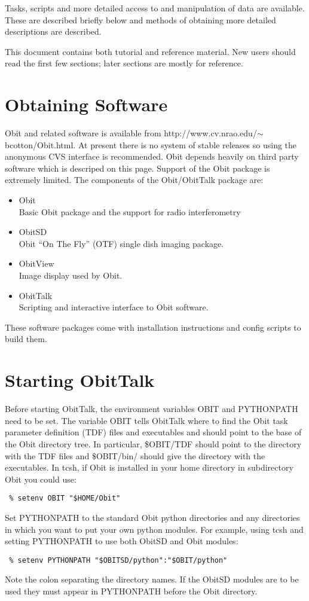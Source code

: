 \documentclass[11pt]{report}
\begin{document}
   Tasks, scripts and more detailed access to and manipulation of data
are available.  These are described briefly below and methods of
obtaining more detailed descriptions are described.

This document contains both tutorial and reference material.
New users should read the first few sections; later sections are
mostly for reference.

\section {Obtaining Software}
Obit and related software is available from
http://www.cv.nrao.edu/$\sim$bcotton/Obit.html. 
At present there is no system of stable releases so using the
anonymous CVS interface is recommended.
Obit depends heavily on third party software which is descriped on
this page.
Support of the Obit package is extremely limited.
The components of the Obit/ObitTalk package are:
\begin{itemize}
\item Obit\\
Basic Obit package and the support for radio interferometry
\item ObitSD\\
Obit ``On The Fly'' (OTF) single dish imaging package.
\item ObitView\\
Image display used by Obit.
\item ObitTalk\\
Scripting and interactive interface to Obit software.
\end{itemize}
These software packages come with installation instructions and config
scripts to build them.

\section {Starting ObitTalk}
Before starting ObitTalk, the environment variables OBIT and PYTHONPATH
need to be set.
The variable OBIT tells ObitTalk where to find the Obit task parameter
definition (TDF) files and executables and should point to the base of
the Obit directory tree.
In particular, \$OBIT/TDF should point to the directory with the TDF
files and \$OBIT/bin/ should give the directory with the
executables.
In tcsh, if Obit is installed in your home directory in subdirectory
Obit you could use:
\begin{verbatim}
 % setenv OBIT "$HOME/Obit"
\end{verbatim}
Set PYTHONPATH to the standard Obit python directories and any
directories in which you want to put your own python modules.
For example, using tcsh and setting PYTHONPATH to use both ObitSD and
Obit modules:
\begin{verbatim}
 % setenv PYTHONPATH "$OBITSD/python":"$OBIT/python"
\end{verbatim}
Note the colon separating the directory names.
If the ObitSD modules are to be used they must appear in PYTHONPATH
before the Obit directory.
\end{document}
